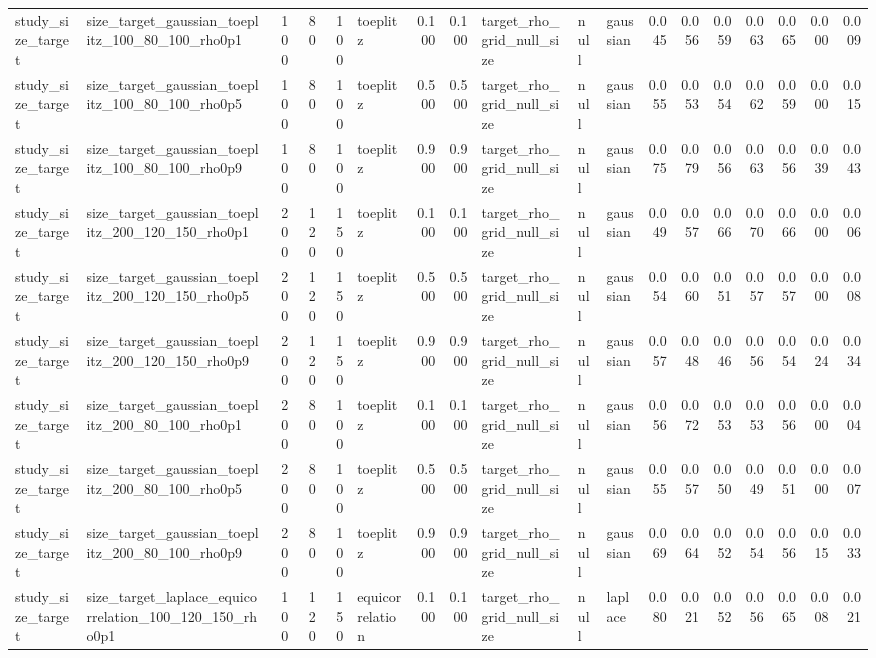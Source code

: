 \begin{tabular}{llrrrlrrlllrrrrrrr}
study\_size\_target & size\_target\_gaussian\_toeplitz\_100\_80\_100\_rho0p1 & 100 & 80 & 100 & toeplitz & 0.100 & 0.100 & target\_rho\_grid\_null\_size & null & gaussian & 0.045 & 0.056 & 0.059 & 0.063 & 0.065 & 0.000 & 0.009 \\
study\_size\_target & size\_target\_gaussian\_toeplitz\_100\_80\_100\_rho0p5 & 100 & 80 & 100 & toeplitz & 0.500 & 0.500 & target\_rho\_grid\_null\_size & null & gaussian & 0.055 & 0.053 & 0.054 & 0.062 & 0.059 & 0.000 & 0.015 \\
study\_size\_target & size\_target\_gaussian\_toeplitz\_100\_80\_100\_rho0p9 & 100 & 80 & 100 & toeplitz & 0.900 & 0.900 & target\_rho\_grid\_null\_size & null & gaussian & 0.075 & 0.079 & 0.056 & 0.063 & 0.056 & 0.039 & 0.043 \\
study\_size\_target & size\_target\_gaussian\_toeplitz\_200\_120\_150\_rho0p1 & 200 & 120 & 150 & toeplitz & 0.100 & 0.100 & target\_rho\_grid\_null\_size & null & gaussian & 0.049 & 0.057 & 0.066 & 0.070 & 0.066 & 0.000 & 0.006 \\
study\_size\_target & size\_target\_gaussian\_toeplitz\_200\_120\_150\_rho0p5 & 200 & 120 & 150 & toeplitz & 0.500 & 0.500 & target\_rho\_grid\_null\_size & null & gaussian & 0.054 & 0.060 & 0.051 & 0.057 & 0.057 & 0.000 & 0.008 \\
study\_size\_target & size\_target\_gaussian\_toeplitz\_200\_120\_150\_rho0p9 & 200 & 120 & 150 & toeplitz & 0.900 & 0.900 & target\_rho\_grid\_null\_size & null & gaussian & 0.057 & 0.048 & 0.046 & 0.056 & 0.054 & 0.024 & 0.034 \\
study\_size\_target & size\_target\_gaussian\_toeplitz\_200\_80\_100\_rho0p1 & 200 & 80 & 100 & toeplitz & 0.100 & 0.100 & target\_rho\_grid\_null\_size & null & gaussian & 0.056 & 0.072 & 0.053 & 0.053 & 0.056 & 0.000 & 0.004 \\
study\_size\_target & size\_target\_gaussian\_toeplitz\_200\_80\_100\_rho0p5 & 200 & 80 & 100 & toeplitz & 0.500 & 0.500 & target\_rho\_grid\_null\_size & null & gaussian & 0.055 & 0.057 & 0.050 & 0.049 & 0.051 & 0.000 & 0.007 \\
study\_size\_target & size\_target\_gaussian\_toeplitz\_200\_80\_100\_rho0p9 & 200 & 80 & 100 & toeplitz & 0.900 & 0.900 & target\_rho\_grid\_null\_size & null & gaussian & 0.069 & 0.064 & 0.052 & 0.054 & 0.056 & 0.015 & 0.033 \\
study\_size\_target & size\_target\_laplace\_equicorrelation\_100\_120\_150\_rho0p1 & 100 & 120 & 150 & equicorrelation & 0.100 & 0.100 & target\_rho\_grid\_null\_size & null & laplace & 0.080 & 0.021 & 0.052 & 0.056 & 0.065 & 0.008 & 0.021 \\

\end{tabular}
